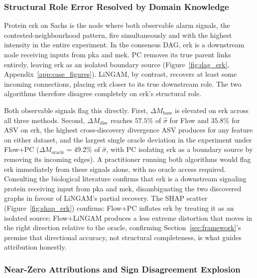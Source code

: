 \documentclass[12pt,letterpaper,twocolumn]{article}
\begin{document}
\subsubsection{Structural Role Error Resolved by Domain Knowledge}

Protein erk on Sachs is the node where both observable alarm signals, the contested-neighbourhood
pattern, fire simultaneously and with the highest intensity in the entire experiment. In the consensus DAG, erk is a
downstream node receiving inputs from pka and mek. PC removes its true parent links
entirely, leaving erk as an isolated boundary source (Figure~\ref{fig:dag_erk}, Appendix~\ref{app:case_figures}). LiNGAM,
by contrast, recovers at least some incoming connections, placing erk closer to its true
downstream role. The two algorithms therefore disagree completely on erk's structural role.

Both observable signals flag this directly. First, $\Delta M_{\text{base}}$ is elevated
on erk across all three methods. Second, $\Delta M_{\text{disc}}$ reaches $57.5\%$ of
$\hat{\sigma}$ for Flow and $35.8\%$ for ASV on erk, the highest cross-discovery
divergence ASV produces for any feature on either dataset, and the largest single oracle
deviation in the experiment under Flow+PC ($\Delta M_{\text{oracle}} = 49.2\%$ of
$\hat{\sigma}$, with PC isolating erk as a boundary source by removing its incoming
edges). A practitioner running both algorithms would flag erk immediately from these
signals alone, with no oracle access required. Consulting the biological literature
confirms that erk is a downstream signaling protein receiving input from pka and mek,
disambiguating the two discovered graphs in favour of LiNGAM's partial recovery.
The SHAP scatter (Figure~\ref{fig:shap_erk}) confirms: Flow+PC inflates erk by treating
it as an isolated source; Flow+LiNGAM produces a less extreme distortion that moves in
the right direction relative to the oracle, confirming Section~\ref{sec:framework}'s
premise that directional accuracy, not structural completeness, is what guides attribution
honestly.

\subsubsection{Near-Zero Attributions and Sign Disagreement Explosion}
\end{document}
